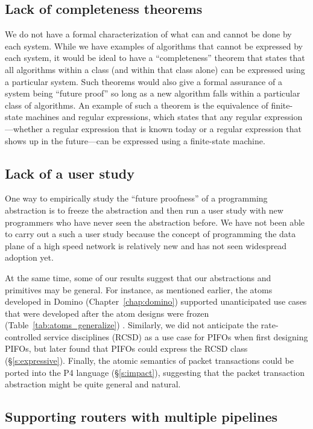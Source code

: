 \subsection{Lack of completeness theorems}
\label{ss:limit_completeness}

We do not have a formal characterization of what can and cannot be done by each
system. While we have examples of algorithms that cannot be expressed by each
system, it would be ideal to have a ``completeness'' theorem that states that
all algorithms within a class (and within that class alone) can be expressed
using a particular system. Such theorems would also give a formal assurance of
a system being ``future proof'' so long as a new algorithm falls within a
particular class of algorithms. An example of such a theorem is the equivalence
of finite-state machines and regular expressions, which states that any regular
expression---whether a regular expression that is known today or a regular
expression that shows up in the future---can be expressed using a finite-state
machine.

\subsection{Lack of a user study} One way to empirically study the ``future
proofness'' of a programming abstraction is to freeze the abstraction and then
run a user study with new programmers who have never seen the abstraction
before. We have not been able to carry out a such a user study because the
concept of programming the data plane of a high speed network is relatively new
and has not seen widespread adoption yet.

At the same time, some of our results suggest that our abstractions and
primitives may be general. For instance, as mentioned earlier, the atoms
developed in Domino (Chapter~\ref{chap:domino}) supported unanticipated use
cases that were developed after the atom designs were frozen
(Table~\ref{tab:atoms_generalize}) . Similarly, we did not anticipate the
rate-controlled service disciplines (RCSD) as a use case for PIFOs when first
designing PIFOs, but later found that PIFOs could express the RCSD class
(\S\ref{s:expressive}).  Finally, the atomic semantics of  packet transactions
could be ported into the P4 language (\S\ref{s:impact}), suggesting that the
packet transaction abstraction might be quite general and natural.

\subsection{Supporting routers with multiple pipelines}
\label{ss:multiple_pipelines}

